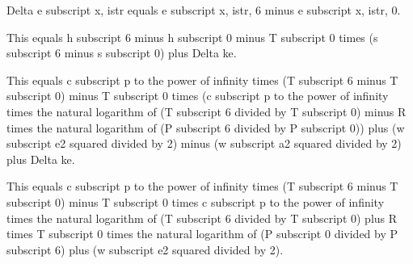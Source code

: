 Delta e subscript x, istr equals e subscript x, istr, 6 minus e subscript x, istr, 0.

This equals h subscript 6 minus h subscript 0 minus T subscript 0 times (s subscript 6 minus s subscript 0) plus Delta ke.

This equals c subscript p to the power of infinity times (T subscript 6 minus T subscript 0) minus T subscript 0 times (c subscript p to the power of infinity times the natural logarithm of (T subscript 6 divided by T subscript 0) minus R times the natural logarithm of (P subscript 6 divided by P subscript 0)) plus (w subscript e2 squared divided by 2) minus (w subscript a2 squared divided by 2) plus Delta ke.

This equals c subscript p to the power of infinity times (T subscript 6 minus T subscript 0) minus T subscript 0 times c subscript p to the power of infinity times the natural logarithm of (T subscript 6 divided by T subscript 0) plus R times T subscript 0 times the natural logarithm of (P subscript 0 divided by P subscript 6) plus (w subscript e2 squared divided by 2).